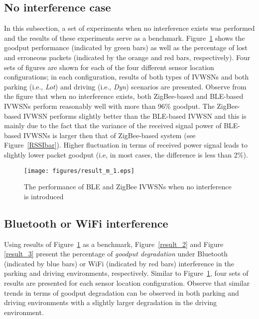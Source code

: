 \documentclass[journal]{IEEEtran}
\begin{document}
\subsection{No interference case}




In this subsection, a set of experiments when no interference exists was performed and the results of these experiments serve as a benchmark. Figure~\ref{result_1} shows the goodput performance (indicated by green bars) as well as the percentage of lost and erroneous packets (indicated by the orange and red bars, respectively). Four sets of figures are shown for each of the four different sensor location configurations; in each configuration, results of both types of IVWSNs and both parking (i.e., \textit{Lot}) and driving (i.e., \textit{Dyn}) scenarios are presented. Observe from the figure that when no interference exists, both ZigBee-based and BLE-based IVWSNs perform reasonably well with more than 96\% goodput. The ZigBee-based IVWSN performs slightly better than the BLE-based IVWSN and this is mainly due to the fact that the variance of the received signal power of BLE-based IVWSNs is larger then that of ZigBee-based system (see Figure~\ref{RSSIbar}). Higher fluctuation in terms of received power signal leads to slightly lower packet goodput (i.e, in most cases, the difference is less than 2\%).

\begin{figure}[tbp]
\centering
\texttt{[image: figures/result\_m\_1.eps]}
\caption{The performance of BLE and ZigBee IVWSNs when no interference is introduced}
\label{result_1}
\end{figure}

\subsection{Bluetooth or WiFi interference}


Using results of Figure~\ref{result_1} as a benchmark, Figure~\ref{result_2} and Figure \ref{result_3} present the percentage of \textit{goodput degradation} under Bluetooth (indicated by blue bars) or WiFi (indicated by red bars) interference in the parking and driving environments, respectively. Similar to Figure~\ref{result_1}, four sets of results are presented for each sensor location configuration. Observe that similar trends in terms of goodput degradation can be observed in both parking and driving environments with a slightly larger degradation in the driving environment. 
\end{document}
